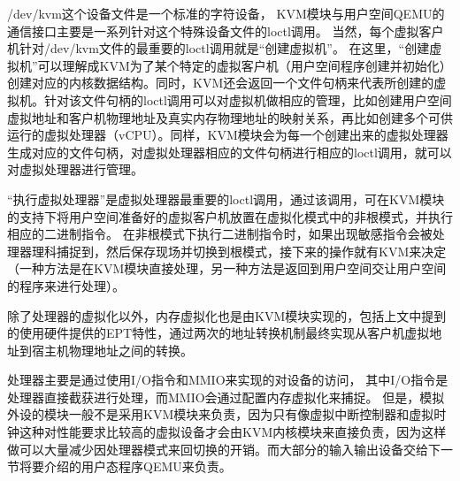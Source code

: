 /dev/kvm这个设备文件是一个标准的字符设备，
KVM模块与用户空间QEMU的通信接口主要是一系列针对这个特殊设备文件的loctl调用。
当然，每个虚拟客户机针对/dev/kvm文件的最重要的loctl调用就是“创建虚拟机”。
在这里，“创建虚拟机”可以理解成KVM为了某个特定的虚拟客户机（用户空间程序创建并初始化）创建对应的内核数据结构。同时，KVM还会返回一个文件句柄来代表所创建的虚拟机。针对该文件句柄的loctl调用可以对虚拟机做相应的管理，比如创建用户空间虚拟地址和客户机物理地址及真实内存物理地址的映射关系，再比如创建多个可供运行的虚拟处理器（vCPU）。同样，KVM模块会为每一个创建出来的虚拟处理器生成对应的文件句柄，对虚拟处理器相应的文件句柄进行相应的loctl调用，就可以对虚拟处理器进行管理。

“执行虚拟处理器”是虚拟处理器最重要的loctl调用，通过该调用，可在KVM模块的支持下将用户空间准备好的虚拟客户机放置在虚拟化模式中的非根模式，并执行相应的二进制指令。
在非根模式下执行二进制指令时，如果出现敏感指令会被处理器理科捕捉到，然后保存现场并切换到根模式，接下来的操作就有KVM来决定（一种方法是在KVM模块直接处理，另一种方法是返回到用户空间交让用户空间的程序来进行处理）。


除了处理器的虚拟化以外，内存虚拟化也是由KVM模块实现的，包括上文中提到的使用硬件提供的EPT特性，通过两次的地址转换机制最终实现从客户机虚拟地址到宿主机物理地址之间的转换。


处理器主要是通过使用I/O指令和MMIO来实现的对设备的访问，
其中I/O指令是处理器直接截获进行处理，而MMIO会通过配置内存虚拟化来捕捉。
但是，模拟外设的模块一般不是采用KVM模块来负责，因为只有像虚拟中断控制器和虚拟时钟这种对性能要求比较高的虚拟设备才会由KVM内核模块来直接负责，因为这样做可以大量减少因处理器模式来回切换的开销。而大部分的输入输出设备交给下一节将要介绍的用户态程序QEMU来负责。

